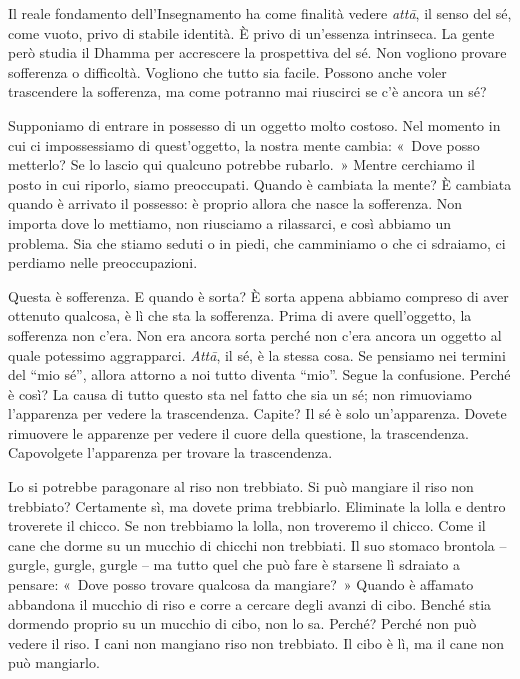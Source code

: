 Il reale fondamento dell'Insegnamento ha come finalità vedere
\emph{attā}, il senso del sé, come vuoto, privo di stabile identità. È
privo di un'essenza intrinseca. La gente però studia il Dhamma per
accrescere la prospettiva del sé. Non vogliono provare sofferenza o
difficoltà. Vogliono che tutto sia facile. Possono anche voler
trascendere la sofferenza, ma come potranno mai riuscirci se c'è ancora
un sé?

Supponiamo di entrare in possesso di un oggetto molto costoso. Nel
momento in cui ci impossessiamo di quest'oggetto, la nostra mente
cambia: «~Dove posso metterlo? Se lo lascio qui qualcuno potrebbe
rubarlo.~» Mentre cerchiamo il posto in cui riporlo, siamo preoccupati.
Quando è cambiata la mente? È cambiata quando è arrivato il possesso: è
proprio allora che nasce la sofferenza. Non importa dove lo mettiamo,
non riusciamo a rilassarci, e così abbiamo un problema. Sia che stiamo
seduti o in piedi, che camminiamo o che ci sdraiamo, ci perdiamo nelle
preoccupazioni.

Questa è sofferenza. E quando è sorta? È sorta appena abbiamo compreso
di aver ottenuto qualcosa, è lì che sta la sofferenza. Prima di avere
quell'oggetto, la sofferenza non c'era. Non era ancora sorta perché non
c'era ancora un oggetto al quale potessimo aggrapparci. \emph{Attā}, il
sé, è la stessa cosa. Se pensiamo nei termini del ``mio sé'', allora
attorno a noi tutto diventa ``mio''. Segue la confusione. Perché è così?
La causa di tutto questo sta nel fatto che sia un sé; non rimuoviamo
l'apparenza per vedere la trascendenza. Capite? Il sé è solo
un'apparenza. Dovete rimuovere le apparenze per vedere il cuore della
questione, la trascendenza. Capovolgete l'apparenza per trovare la
trascendenza.

Lo si potrebbe paragonare al riso non trebbiato. Si può mangiare il riso
non trebbiato? Certamente sì, ma dovete prima trebbiarlo. Eliminate la
lolla e dentro troverete il chicco. Se non trebbiamo la lolla, non
troveremo il chicco. Come il cane che dorme su un mucchio di chicchi non
trebbiati. Il suo stomaco brontola -- gurgle, gurgle, gurgle -- ma tutto
quel che può fare è starsene lì sdraiato a pensare: «~Dove posso trovare
qualcosa da mangiare?~» Quando è affamato abbandona il mucchio di riso e
corre a cercare degli avanzi di cibo. Benché stia dormendo proprio su un
mucchio di cibo, non lo sa. Perché? Perché non può vedere il riso. I
cani non mangiano riso non trebbiato. Il cibo è lì, ma il cane non può
mangiarlo.

